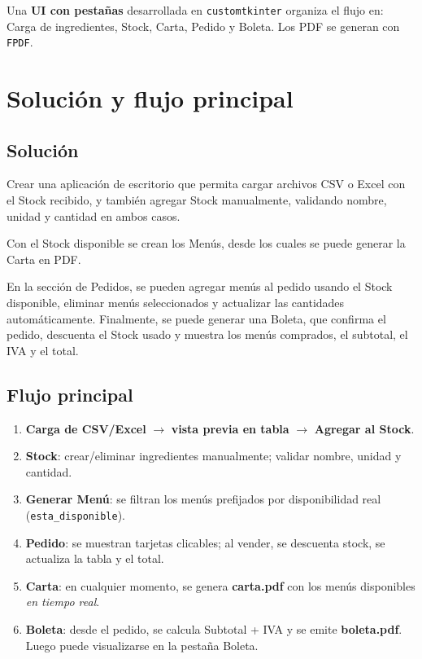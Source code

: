 \documentclass[12pt,a4paper]{article}
\begin{document}
Una \textbf{UI con pestañas} desarrollada en \texttt{customtkinter} organiza el flujo en: Carga de ingredientes, Stock, Carta, Pedido y Boleta. Los PDF se generan con \texttt{FPDF}.

\newpage

\section{Solución y flujo principal}
\subsection*{Solución}

Crear una aplicación de escritorio que permita cargar archivos CSV o Excel con el Stock recibido, y también agregar Stock manualmente, validando nombre, unidad y cantidad en ambos casos.

Con el Stock disponible se crean los Menús, desde los cuales se puede generar la Carta en PDF.

En la sección de Pedidos, se pueden agregar menús al pedido usando el Stock disponible, eliminar menús seleccionados y actualizar las cantidades automáticamente.
Finalmente, se puede generar una Boleta, que confirma el pedido, descuenta el Stock usado y muestra los menús comprados, el subtotal, el IVA y el total.

\subsection*{Flujo principal}
\begin{enumerate}[leftmargin=*]
  \item \textbf{Carga de CSV/Excel} $\rightarrow$ \textbf{vista previa en tabla} $\rightarrow$ \textbf{Agregar al Stock}.
  \item \textbf{Stock}: crear/eliminar ingredientes manualmente; validar nombre,    unidad y cantidad.
  \item \textbf{Generar Menú}: se filtran los menús prefijados por disponibilidad real (\texttt{esta\_disponible}).
  \item \textbf{Pedido}: se muestran tarjetas clicables; al vender, se descuenta stock, se actualiza la tabla y el total.
  \item \textbf{Carta}: en cualquier momento, se genera \textbf{carta.pdf} con los menús disponibles \textit{en tiempo real}.
  \item \textbf{Boleta}: desde el pedido, se calcula Subtotal + IVA y se emite \textbf{boleta.pdf}. Luego puede visualizarse en la pestaña Boleta.
\end{enumerate}
\end{document}

